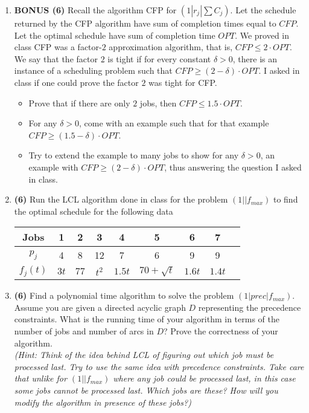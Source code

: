 \documentclass[10pt]{article}
\begin{document}
\begin{enumerate}
\item {\bf BONUS (6)}
Recall the algorithm CFP for $(1|r_j|\sum C_j)$. Let the schedule returned by the CFP algorithm
have sum of completion times equal to $CFP$. Let the optimal schedule have sum of completion time $OPT$.
We proved in class CFP was a factor-$2$ approximation algorithm, that is, $CFP \le 2\cdot OPT$.
We say that the factor $2$ is tight if for every constant $\delta > 0$, there is an instance of a scheduling problem such that 
$CFP \ge (2-\delta)\cdot OPT$. I asked in class if one could prove the factor $2$ was tight for CFP. 
\begin{itemize}
\item Prove that if there are only $2$ jobs, then $CFP \le 1.5\cdot OPT$.
\item For any $\delta > 0$, come with an example such that for that example $CFP \ge (1.5 - \delta)\cdot OPT$.
\item Try to extend the example to many jobs to show for any $\delta > 0$, an example with $CFP \ge (2 - \delta)\cdot OPT$,
thus answering the question I asked in class.
\end{itemize}

\item {\bf (6)}
Run the LCL algorithm done in class for the problem $(1||f_{max})$ to find the optimal schedule for the following 
data
\begin{center}
\begin{tabular}{|c|c|c|c|c|c|c|c|c|}
\hline
Jobs   & 1 & 2 & 3 & 4 & 5 & 6 & 7\\ \hline
$p_j$ &  4 & 8 & 12 & 7 & 6 & 9 & 9 \\
$f_j(t)$  & $3t$ & $77$ & $t^2$ & $1.5t$ & $70+\sqrt{t}$ & $1.6t$ & $1.4t$\\
\hline
\end{tabular}
\end{center}


\item {\bf (6)}
Find a polynomial time algorithm to solve the problem $(1|prec|f_{max})$. Assume you are given a directed acyclic graph
$D$ representing the precedence constraints. What is the running time of your algorithm in terms of the number of jobs and number
of arcs in $D$? Prove the correctness of your algorithm.\\
{\em (Hint: Think of the idea behind LCL of figuring out which job must be processed last. Try to use the same idea with precedence constraints.
Take care that unlike for $(1||f_{max})$ 
where any job could be processed last, in this case some jobs {\em cannot} be processed last. Which jobs are these? How will you modify the algorithm
in presence of these jobs?)}


\end{enumerate}
\end{document}
